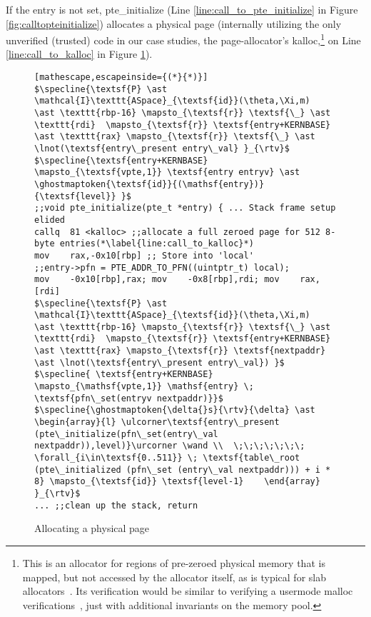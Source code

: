 If the entry is not set, \textsf{pte\_initialize} (Line \ref{line:call_to_pte_initialize} in Figure \ref{fig:calltopteinitialize}) 
allocates a physical page (internally utilizing the only unverified (trusted) code in our case studies, the page-allocator's \textsf{kalloc},\footnote{
  This is an allocator for regions of pre-zeroed physical memory that is mapped, but not accessed by the allocator itself,
  as is typical for slab allocators~\cite{bonwick1994slab}.
  Its verification would be similar to verifying a usermode \textsf{malloc} verifications~\cite{Chlipala2013Bedrock,wickerson2010explicit},
  just with additional invariants on the memory pool.
} 
on Line \ref{line:call_to_kalloc} in Figure \ref{pteinitializespec}). 
\begin{figure}\footnotesize
  \begin{lstlisting}[mathescape,escapeinside={(*}{*)}]
$\specline{\textsf{P} \ast \mathcal{I}\texttt{ASpace}_{\textsf{id}}(\theta,\Xi,m)   \ast \texttt{rbp-16} \mapsto_{\textsf{r}} \textsf{\_} \ast \texttt{rdi}  \mapsto_{\textsf{r}} \textsf{entry+KERNBASE}  \ast \texttt{rax} \mapsto_{\textsf{r}} \textsf{\_} \ast \lnot(\textsf{entry\_present entry\_val} }_{\rtv}$
$\specline{\textsf{entry+KERNBASE} \mapsto_{\textsf{vpte,1}} \textsf{entry entryv} \ast \ghostmaptoken{\textsf{id}}{(\mathsf{entry})}{\textsf{level}} }$
;;void pte_initialize(pte_t *entry) { ... Stack frame setup elided    
callq  81 <kalloc> ;;allocate a full zeroed page for 512 8-byte entries(*\label{line:call_to_kalloc}*)
mov    rax,-0x10[rbp] ;; Store into 'local'
;;entry->pfn = PTE_ADDR_TO_PFN((uintptr_t) local);
mov    -0x10[rbp],rax; mov    -0x8[rbp],rdi; mov    rax,[rdi]
$\specline{\textsf{P} \ast \mathcal{I}\texttt{ASpace}_{\textsf{id}}(\theta,\Xi,m)   \ast \texttt{rbp-16} \mapsto_{\textsf{r}} \textsf{\_} \ast \texttt{rdi}  \mapsto_{\textsf{r}} \textsf{entry+KERNBASE} \ast \texttt{rax} \mapsto_{\textsf{r}} \textsf{nextpaddr} \ast \lnot(\textsf{entry\_present entry\_val}) }$
$\specline{ \textsf{entry+KERNBASE} \mapsto_{\mathsf{vpte,1}} \mathsf{entry} \; \textsf{pfn\_set(entryv nextpaddr)}}$
$\specline{\ghostmaptoken{\delta{}s}{\rtv}{\delta} \ast \begin{array}{l} \ulcorner\textsf{entry\_present (pte\_initialize(pfn\_set(entry\_val nextpaddr)),level)}\urcorner \wand \\  \;\;\;\;\;\;\; \forall_{i\in\textsf{0..511}} \; \textsf{table\_root (pte\_initialized (pfn\_set (entry\_val nextpaddr))) + i * 8} \mapsto_{\textsf{id}} \textsf{level-1}    \end{array}  }_{\rtv}$
... ;;clean up the stack, return
\end{lstlisting}
\vspace{-1em}
\caption{Allocating a physical page }
\label{pteinitializespec}
\vspace{-1em}
\end{figure}

